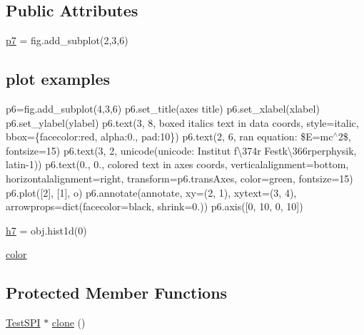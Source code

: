 \subsection*{Public Attributes}
\begin{DoxyCompactItemize}
\item 
\hyperlink{classTestSPI_a8bbe85cbd3103cebe821dc87f0c01008}{p7} = fig.\+add\+\_\+subplot(2,3,6)
\begin{DoxyCompactList}\small\item\em \subsection*{plot examples}

p6=fig.\+add\+\_\+subplot(4,3,6) p6.\+set\+\_\+title(\textquotesingle{}axes title\textquotesingle{}) p6.\+set\+\_\+xlabel(\textquotesingle{}xlabel\textquotesingle{}) p6.\+set\+\_\+ylabel(\textquotesingle{}ylabel\textquotesingle{}) p6.\+text(3, 8, \textquotesingle{}boxed italics text in data coords\textquotesingle{}, style=\textquotesingle{}italic\textquotesingle{}, bbox=\{\textquotesingle{}facecolor\textquotesingle{}\+:\textquotesingle{}red\textquotesingle{}, \textquotesingle{}alpha\textquotesingle{}\+:0., \textquotesingle{}pad\textquotesingle{}\+:10\}) p6.\+text(2, 6, r\textquotesingle{}an equation\+: \$E=mc$^\wedge$2\$\textquotesingle{}, fontsize=15) p6.\+text(3, 2, unicode(\textquotesingle{}unicode\+: Institut f\textbackslash{}374r Festk\textbackslash{}366rperphysik\textquotesingle{}, \textquotesingle{}latin-\/1\textquotesingle{})) p6.\+text(0., 0., \textquotesingle{}colored text in axes coords\textquotesingle{}, verticalalignment=\textquotesingle{}bottom\textquotesingle{}, horizontalalignment=\textquotesingle{}right\textquotesingle{}, transform=p6.\+trans\+Axes, color=\textquotesingle{}green\textquotesingle{}, fontsize=15) p6.\+plot(\mbox{[}2\mbox{]}, \mbox{[}1\mbox{]}, \textquotesingle{}o\textquotesingle{}) p6.\+annotate(\textquotesingle{}annotate\textquotesingle{}, xy=(2, 1), xytext=(3, 4), arrowprops=dict(facecolor=\textquotesingle{}black\textquotesingle{}, shrink=0.)) p6.\+axis(\mbox{[}0, 10, 0, 10\mbox{]}) \end{DoxyCompactList}\item 
\hyperlink{classTestSPI_aa072fcb2c8a99033ff634a04ac375ac7}{h7} = obj.\+hist1d(0)
\item 
\hyperlink{classTestSPI_aace1197ad912510316ec3d9dad79ebf6}{color}
\end{DoxyCompactItemize}
\subsection*{Protected Member Functions}
\begin{DoxyCompactItemize}
\item 
\hyperlink{classTestSPI_1_1TestSPI}{Test\+S\+PI} $\ast$ \hyperlink{classTestSPI_afbca7dd9802d226ee1fec8475ff5f127}{clone} ()
\end{DoxyCompactItemize}
